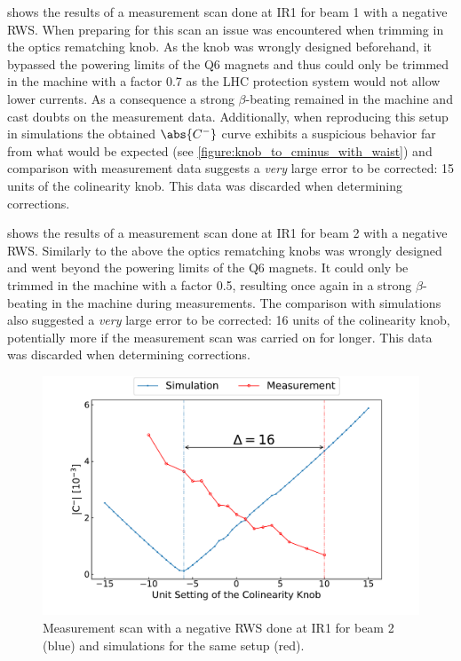  shows the results of a measurement scan done at IR\num{1} for beam \num{1} with a negative RWS.
When preparing for this scan an issue was encountered when trimming in the optics rematching knob.
As the knob was wrongly designed beforehand, it bypassed the powering limits of the Q\num{6} magnets and thus could only be trimmed in the machine with a factor \num{0.7} as the LHC protection system would not allow lower currents.
As a consequence a strong \(\beta\)-beating remained in the machine and cast doubts on the measurement data. 
Additionally, when reproducing this setup in simulations the obtained \(\abs{C^{-}}\) curve exhibits a suspicious behavior far from what would be expected (see \cref{figure:knob_to_cminus_with_waist}) and comparison with measurement data suggests a \textit{very} large error to be corrected: \num{15} units of the colinearity knob.
This data was discarded when determining corrections.

 shows the results of a measurement scan done at IR\num{1} for beam \num{2} with a negative RWS.
Similarly to the above the optics rematching knobs was wrongly designed and went beyond the powering limits of the Q\num{6} magnets.
It could only be trimmed in the machine with a factor \num{0.5}, resulting once again in a strong \(\beta\)-beating in the machine during measurements.
The comparison with simulations also suggested a \textit{very} large error to be corrected: \num{16} units of the colinearity knob, potentially more if the measurement scan was carried on for longer.
This data was discarded when determining corrections.

\begin{figure}[!htb]
    \centering
    \includegraphics*[width=\textwidth]{Figures/Appendices/rws_measurement_ir1_b2_neg.pdf}
    \caption{Measurement scan with a negative RWS done at IR\num{1} for beam \num{2} (\textcolor{mplblue}{blue}) and simulations for the same setup (\textcolor{mplr}{red}).}
    \label{figure:ir1_b2_neg_measurement}
\end{figure}

